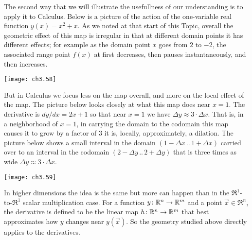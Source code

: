 The second way that we will illustrate the usefullness of
our understanding is to apply it to Calculus.
Below is a picture
of the action of the one-variable real function \( y(x)=x^2+x \).
As we noted 
at that start of this Topic, overall the geometric effect of this map is
irregular in that at different domain points it has different effects; for
example as the domain point $x$ goes from $2$ to $-2$, the associated range
point $f(x)$ at first decreases, then pauses instantaneously,
and then increases.
\begin{center}
  \texttt{[image: ch3.58]}
\end{center}
But in Calculus we focus less on the map overall, and more 
on the local effect of the map.
The picture below looks closely at what this map
does near $x=1$.
The derivative is $dy/dx=2x+1$
so that near \( x=1 \) 
we have \( \Delta y\approx 3\cdot\Delta x \).
That is, in a neighborhood of $x=1$,
in carrying the domain to the codomain this map causes it to grow by
a factor of $3$ \Dash  it is, locally, 
approximately, a dilation.
The picture below shows a small interval 
in the domain $(1-\Delta x\,..\,1+\Delta x)$
carried over to an interval in the codomain $(2-\Delta y\,..\,2+\Delta y)$
that is three times as wide $\Delta y \approx 3\cdot \Delta x$.
\begin{center}
  \texttt{[image: ch3.59]}
\end{center}

In higher dimensions the idea is the same but more can happen than in the 
$\Re^1$-to-$\Re^1$ scalar multiplication case.
For a function \( \mbox{$y\colon \mathbb{R}^n\to \mathbb{R}^m$} \) and a point \( \vec{x}\in\Re^n \),
the derivative is defined to be the 
linear map \( \mbox{$h\colon \mathbb{R}^n\to \mathbb{R}^m$} \) that best approximates
how \( y \) changes near \( y(\vec{x}) \).
So the geometry studied above directly applies to the derivatives.

